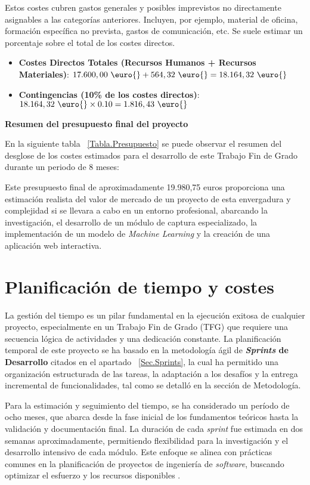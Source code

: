 Estos costes cubren gastos generales y posibles imprevistos no directamente asignables a las categorías anteriores. Incluyen, por ejemplo, material de oficina, formación específica no prevista, gastos de comunicación, etc. Se suele estimar un porcentaje sobre el total de los costes directos.
\begin{itemize}
    \item\textbf{Costes Directos Totales (Recursos Humanos + Recursos Materiales)}: $\displaystyle 17.600,00 \text{ \euro{}} + 564,32 \text{ \euro{}} = 18.164,32 \text{ \euro{}}$
    
    \item\textbf{Contingencias (10\% de los costes directos)}:$\displaystyle 18.164,32 \text{ \euro{}} \times 0.10 = 1.816,43 \text{ \euro{}}$
\end{itemize}

\textbf{Resumen del presupuesto final del proyecto}

En la siguiente tabla ~\ref{Tabla.Presupuesto} se puede observar el resumen del desglose de los costes estimados para el desarrollo de este Trabajo Fin de Grado durante un periodo de 8 meses:



Este presupuesto final de aproximadamente 19.980,75 euros proporciona una estimación realista del valor de mercado de un proyecto de esta envergadura y complejidad si se llevara a cabo en un entorno profesional, abarcando la investigación, el desarrollo de un módulo de captura especializado, la implementación de un modelo de \textit{Machine Learning} y la creación de una aplicación web interactiva.

\section{Planificación de tiempo y costes}
La gestión del tiempo es un pilar fundamental en la ejecución exitosa de cualquier proyecto, especialmente en un Trabajo Fin de Grado (TFG) que requiere una secuencia lógica de actividades y una dedicación constante. La planificación temporal de este proyecto se ha basado en la metodología ágil de \textbf{\textit{Sprints} de Desarrollo} citados en el apartado ~\ref{Sec.Sprints}, la cual ha permitido una organización estructurada de las tareas, la adaptación a los desafíos y la entrega incremental de funcionalidades, tal como se detalló en la sección de Metodología.

Para la estimación y seguimiento del tiempo, se ha considerado un período de ocho meses, que abarca desde la fase inicial de los fundamentos teóricos hasta la validación y documentación final. La duración de cada \textit{sprint} fue estimada en dos semanas aproximadamente, permitiendo flexibilidad para la investigación y el desarrollo intensivo de cada módulo. Este enfoque se alinea con prácticas comunes en la planificación de proyectos de ingeniería de \textit{software}, buscando optimizar el esfuerzo y los recursos disponibles \cite{NIST2020SP800-115}.

